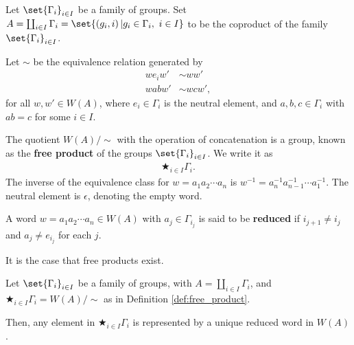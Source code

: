 \begin{definition}\label{def:free_product}
  Let $\set{\Gamma_i}_{i\in I}$ be a family of groups. Set $A = \coprod_{i\in I}\Gamma_i = \set{\left(g_i,i\right) | g_i\in \Gamma_i,~i\in I}$ to be the coproduct of the family $\set{\Gamma_i}_{i\in I}$.\newline

  Let $\sim$ be the equivalence relation generated by
  \begin{align*}
    we_iw' &\sim ww'\\
    wabw' &\sim wcw',
  \end{align*}
  for all $w,w'\in W(A)$, where $e_i\in \Gamma_i$ is the neutral element, and $a,b,c\in \Gamma_i$ with $ab = c$ for some $i\in I$.\newline

  The quotient $W(A) / \sim$ with the operation of concatenation is a group, known as the \textbf{free product} of the groups $\set{\Gamma_i}_{i\in I}$. We write it as
  \begin{align*}
    \bigstar_{i\in I}\Gamma_i.
  \end{align*}
  The inverse of the equivalence class for $w = a_1a_2\cdots a_n$ is $w^{-1} = a_{n}^{-1}a_{n-1}^{-1}\cdots a_{1}^{-1}$. The neutral element is $\epsilon$, denoting the empty word.\newline

  A word $w = a_1a_2\cdots a_n\in W(A)$ with $a_j\in \Gamma_{i_j}$ is said to be \textbf{reduced} if $i_{j + 1}\neq i_j$ and $a_j \neq e_{i_j}$ for each $j$.
\end{definition}
It is the case that free products exist.
\begin{proposition}\label{prop:reduced_words}
  Let $\set{\Gamma_i}_{i\in I}$ be a family of groups, with $A = \coprod_{i\in I}\Gamma_i$, and $\bigstar_{i\in I}\Gamma_i = W(A) / \sim$ as in Definition \ref{def:free_product}.\newline

  Then, any element in $\bigstar_{i\in I}\Gamma_i$ is represented by a unique reduced word in $W(A)$.
\end{proposition}
